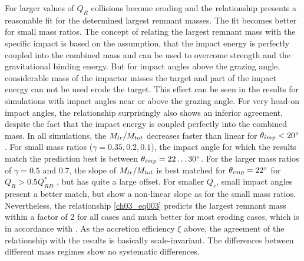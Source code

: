 For larger values of $Q_R$ collisions become eroding and the relationship presents a reasonable fit for the determined largest remnant masses. The fit becomes better for small mass ratios. The concept of relating the largest remnant mass with the specific impact is based on the assumption, that the impact energy is perfectly coupled into the combined mass and can be used to overcome strength and the gravitational binding energy. But for impact angles above the grazing angle, considerable mass of the impactor misses the target and part of the impact energy can not be used erode the target. This effect can be seen in the results for simulations with impact angles near or above the grazing angle. For very head-on impact angles, the relationship surprisingly also shows an inferior agreement, despite the fact that the impact energy is coupled perfectly into the combined mass. In all simulations, the $M_{lr} / M_{tot}$ decreases faster than linear for $\theta_{imp} < 20 ^\circ$. For small mass ratios ($\gamma = 0.35, 0.2, 0.1$), the impact angle for which the results match the prediction best is between $\theta_{imp} = 22 \dots 30 ^\circ$. For the larger mass ratios of $\gamma = 0.5$ and $0.7$, the slope of $M_{lr} / M_{tot}$ is best matched for $\theta_{imp} = 22 ^\circ$ for $Q_R > 0.5 Q^*_{RD}$ , but has quite a large offset. For smaller $Q_r$, small impact angles present a better match, but show a non-linear slope as for the small mass ratios. Nevertheless, the relationship \ref{ch03_eq003} predicts the largest remnant mass within a factor of 2 for all cases and much better for most eroding cases, which is in accordance with \cite{2009ApJ...700L.118M}. As the accretion efficiency $\xi$ above, the agreement of the relationship with the results is basically scale-invariant. The differences between different mass regimes show no systematic differences.

